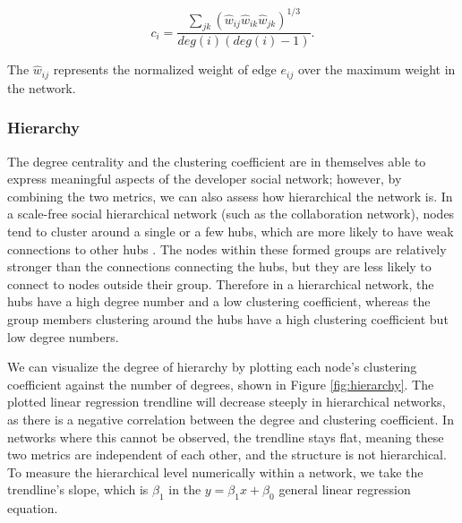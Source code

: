 \[ c_i = \frac{\sum_{jk}(\hat{w}_{ij}\hat{w}_{ik}\hat{w}_{jk})^{1/3}}{deg(i)(deg(i)-1)}. \]

The $\hat{w}_{ij}$ represents the normalized weight of edge $e_{ij}$ over the maximum weight in the network.

\subsubsection{Hierarchy}
\label{sec:hierarchy}

The degree centrality and the clustering coefficient are in themselves able to express meaningful aspects of the developer social network; however, by combining the two metrics, we can also assess how hierarchical the network is. In a scale-free social hierarchical network (such as the collaboration network), nodes tend to cluster around a single or a few hubs, which are more likely to have weak connections to other hubs \cite{ravaszHierarchicalOrganizationComplex2003, joblinEvolutionaryTrendsDeveloper2017}. The nodes within these formed groups are relatively stronger than the connections connecting the hubs, but they are less likely to connect to nodes outside their group. Therefore in a hierarchical network, the hubs have a high degree number and a low clustering coefficient, whereas the group members clustering around the hubs have a high clustering coefficient but low degree numbers.

We can visualize the degree of hierarchy by plotting each node's clustering coefficient against the number of degrees, shown in Figure \ref{fig:hierarchy}. The plotted linear regression trendline will decrease steeply in hierarchical networks, as there is a negative correlation between the degree and clustering coefficient. In networks where this cannot be observed, the trendline stays flat, meaning these two metrics are independent of each other, and the structure is not hierarchical. To measure the hierarchical level numerically within a network, we take the trendline's slope, which is $\beta_1$ in the $y=\beta_1x + \beta_0$ general linear regression equation.

